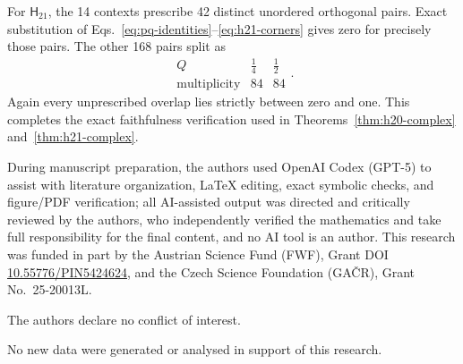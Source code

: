 \documentclass[twocolumn,aps,pra,floatfix,amsmath,amssymb,longbibliography]{revtex4-2}
\theoremstyle{definition}
\theoremstyle{remark}
\newcommand{\Htwentyone}{\mathsf H_{21}}
\begin{document}
For $\Htwentyone$, the 14 contexts prescribe 42 distinct unordered
orthogonal pairs.  Exact substitution of
Eqs.~\eqref{eq:pq-identities}--\eqref{eq:h21-corners} gives zero for
precisely those pairs.  The other 168 pairs split as
\begin{equation}
 \begin{array}{c|cc}
 Q&\frac14&\frac12\\ \hline
 \text{multiplicity}&84&84
 \end{array}.
 \label{eq:H21-Q-table}
\end{equation}
Again every unprescribed overlap lies strictly between zero and one.
This completes the exact faithfulness verification used in
Theorems~\ref{thm:h20-complex} and~\ref{thm:h21-complex}.

\begin{acknowledgments}
During manuscript preparation, the authors used OpenAI Codex (GPT-5) to assist with literature organization, LaTeX editing, exact symbolic checks, and figure/PDF verification; all AI-assisted output was directed and critically reviewed by the authors, who independently verified the mathematics and take full responsibility for the final content, and no AI tool is an author.
This research was funded in part by the Austrian
Science Fund (FWF), Grant DOI \href{https://doi.org/10.55776/PIN5424624}{10.55776/PIN5424624}, and the Czech Science
Foundation (GA\v{C}R), Grant No.~25-20013L.

The authors declare no conflict of interest.

No new data were generated or analysed in support of this research.
\end{acknowledgments}


\end{document}
